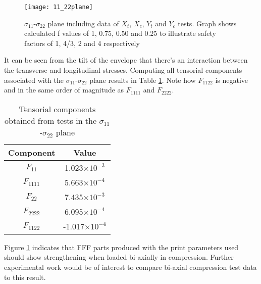 \documentclass[main.tex]{subfiles}
\begin{document}
\begin{figure}[!htbp]
	\center
	\texttt{[image: 11\_22plane]}
	\captionsetup{justification=centering} %
	\caption[failure envelope in the $\sigma_{11}$-$\sigma_{22}$ plane]{$\sigma_{11}$-$\sigma_{22}$ plane including data of $X_t$, $X_c$, $Y_t$ and $Y_c$ tests. Graph shows calculated f values of 1, 0.75, 0.50 and 0.25 to illustrate safety factors of 1, 4/3, 2 and 4 respectively} \label{fig:1122plane}
\end{figure}

It can be seen from the tilt of the envelope that there's an interaction between the transverse and longitudinal stresses. Computing all tensorial components associated with the  $\sigma_{11}$-$\sigma_{22}$ plane results in Table \ref{tab:1122calc}. Note how $F_{1122}$ is negative and in the same order of magnitude as $F_{1111}$ and $F_{2222}$. 

\begin{table} [h]
	\centering
	\caption{Tensorial components obtained from tests in the $\sigma_{11}$-$\sigma_{22}$ plane}
	\begin{tabular}{ c c } 
		\toprule
		\textbf{Component} & \textbf{Value} \\
		\midrule
		$F_{11}$ & 1.023$\times 10^{-3}$\\ [1ex]
		$F_{1111}$ & 5.663$\times 10^{-4}$\\ [1ex]
		$F_{22}$ & 7.435$\times 10^{-3}$\\ [1ex]
		$F_{2222}$ & 6.095$\times 10^{-4}$\\ [1ex]
		$F_{1122}$ & -1.017$\times 10^{-4}$\\ [1ex]
		\bottomrule
	\end{tabular}
	\label{tab:1122calc}
\end{table}  

Figure \ref{fig:1122plane} indicates that FFF parts produced with the print parameters used should show strengthening when loaded bi-axially in compression. Further experimental work would be of interest to compare bi-axial compression test data to this result.


% 

\end{document}
